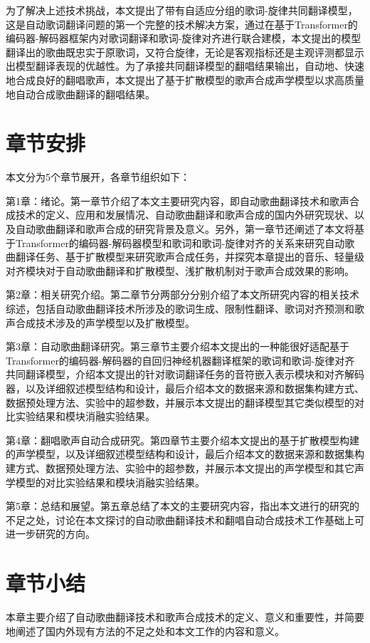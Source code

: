 为了解决上述技术挑战，本文提出了带有自适应分组的歌词-旋律共同翻译模型，这是自动歌词翻译问题的第一个完整的技术解决方案，通过在基于Transformer的编码器-解码器框架内对歌词翻译和歌词-旋律对齐进行联合建模，本文提出的模型翻译出的歌曲既忠实于原歌词，又符合旋律，无论是客观指标还是主观评测都显示出模型翻译表现的优越性。为了承接共同翻译模型的翻唱结果输出，自动地、快速地合成良好的翻唱歌声，本文提出了基于扩散模型的歌声合成声学模型以求高质量地自动合成歌曲翻译的翻唱结果。
\section{章节安排}
本文分为5个章节展开，各章节组织如下：

第1章：绪论。第一章节介绍了本文主要研究内容，即自动歌曲翻译技术和歌声合成技术的定义、应用和发展情况、自动歌曲翻译和歌声合成的国内外研究现状、以及自动歌曲翻译和歌声合成的研究背景及意义。另外，第一章节还阐述了本文将基于Transformer的编码器-解码器模型和歌词和歌词-旋律对齐的关系来研究自动歌曲翻译任务、基于扩散模型来研究歌声合成任务，并探究本章提出的音乐、轻量级对齐模块对于自动歌曲翻译和扩散模型、浅扩散机制对于歌声合成效果的影响。

第2章：相关研究介绍。第二章节分两部分分别介绍了本文所研究内容的相关技术综述，包括自动歌曲翻译技术所涉及的歌词生成、限制性翻译、歌词对齐预测和歌声合成技术涉及的声学模型以及扩散模型。

第3章：自动歌曲翻译研究。第三章节主要介绍本文提出的一种能很好适配基于Transformer的编码器-解码器的自回归神经机器翻译框架的歌词和歌词-旋律对齐共同翻译模型，介绍本文提出的针对歌词翻译任务的音符嵌入表示模块和对齐解码器，以及详细叙述模型结构和设计，最后介绍本文的数据来源和数据集构建方式、数据预处理方法、实验中的超参数，并展示本文提出的翻译模型其它类似模型的对比实验结果和模块消融实验结果。

第4章：翻唱歌声自动合成研究。第四章节主要介绍本文提出的基于扩散模型构建的声学模型，以及详细叙述模型结构和设计，最后介绍本文的数据来源和数据集构建方式、数据预处理方法、实验中的超参数，并展示本文提出的声学模型和其它声学模型的对比实验结果和模块消融实验结果。

第5章：总结和展望。第五章总结了本文的主要研究内容，指出本文进行的研究的不足之处，讨论在本文探讨的自动歌曲翻译技术和翻唱自动合成技术工作基础上可进一步研究的方向。
\section{章节小结}
本章主要介绍了自动歌曲翻译技术和歌声合成技术的定义、意义和重要性，并简要地阐述了国内外现有方法的不足之处和本文工作的内容和意义。
